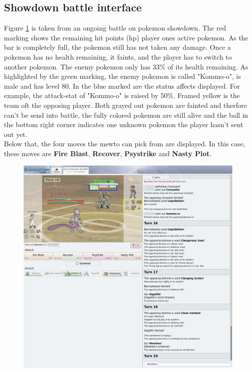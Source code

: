 \documentclass{article}
\begin{document}
\subsection{Showdown battle interface}
Figure \ref{fig:showdown-battle} is taken from an ongoing battle on pokemon
showdown. The red marking shows the remaining hit points (hp) player ones
active pokemon. As the bar is completely full, the pokemon still has 
not taken any damage. Once a pokemon has no health remaining, it faints,
and the player has to switch to another pokemon. 
The enemy pokemon
only has 33\% of its health remaining. As highlighted by the green 
marking, the enemy pokemon is called "Kommo-o", is male and has
level 80. In the blue marked are the status affects displayed. For
example, the attack-stat of "Kommo-o" is raised by 50\%. Framed
yellow is the team oft the opposing player. Both grayed out
pokemon are fainted and therfore can't be send into battle,
the fully colored pokemon are still alive and the ball in
the bottom right corner indicates one unknown pokemon the 
player hasn't sent out yet. \\
Below that, the four moves the mewto can pick from are displayed.
In this case, these moves are \textbf{Fire Blast}, \textbf{Recover},
\textbf{Psystrike} and \textbf{Nasty Plot}.

\begin{figure}[ht]
  \centering
  \includegraphics[width=.9\linewidth]{images/Showdown.png}
  \label{fig:showdown-battle}
\end{figure}
\end{document}

